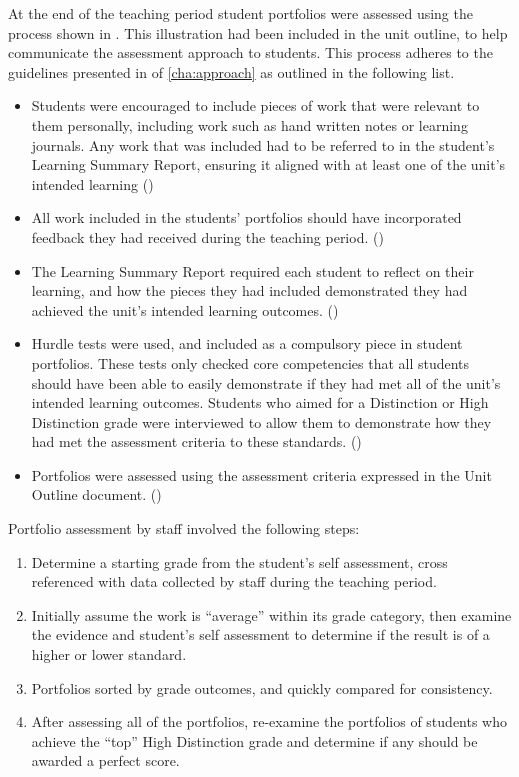 At the end of the teaching period student portfolios were assessed using the process shown in . This illustration had been included in the unit outline, to help communicate the assessment approach to students. This process adheres to the guidelines presented in  of \cref{cha:approach} as outlined in the following list.
\begin{itemize}[noitemsep,nolistsep]
 	\item Students were encouraged to include pieces of work that were relevant to them personally, including work such as hand written notes or learning journals. Any work that was included had to be referred to in the student's Learning Summary Report, ensuring it aligned with at least one of the unit's intended learning ()
 	\item All work included in the students' portfolios should have incorporated feedback they had received during the teaching period. ()
 	\item The Learning Summary Report required each student to reflect on their learning, and how the pieces they had included demonstrated they had achieved the unit's intended learning outcomes. ()
 	\item Hurdle tests were used, and included as a compulsory piece in student portfolios. These tests only checked core competencies that all students should have been able to easily demonstrate if they had met all of the unit's intended learning outcomes. Students who aimed for a Distinction or High Distinction grade were interviewed to allow them to demonstrate how they had met the assessment criteria to these standards. ()
 	\item Portfolios were assessed using the assessment criteria expressed in the Unit Outline document. ()
 \end{itemize} 

Portfolio assessment by staff involved the following steps:
\begin{enumerate}
	\item Determine a starting grade from the student's self assessment, cross referenced with data collected by staff during the teaching period.
	\item Initially assume the work is ``average'' within its grade category, then examine the evidence and student's self assessment to determine if the result is of a higher or lower standard.
	\item Portfolios sorted by grade outcomes, and quickly compared for consistency.
	\item After assessing all of the portfolios, re-examine the portfolios of students who achieve the ``top'' High Distinction grade and determine if any should be awarded a perfect score.
\end{enumerate}

